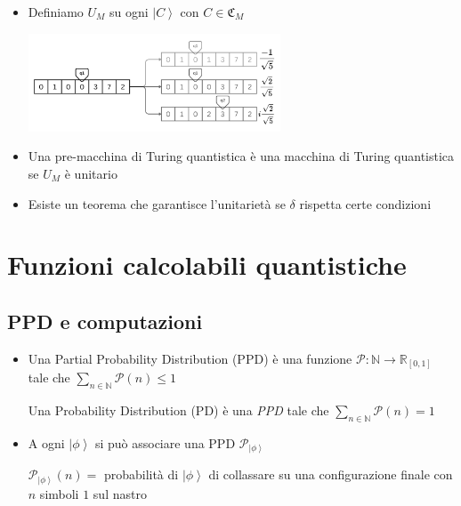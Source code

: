 \documentclass{beamer}
\newcommand{\ket}[1]{\left | #1 \right \rangle}
\newcommand{\conf}{\mathfrak{C}_{M}}
\begin{document}
\begin{frame}{\subsecname}{}
	\begin{itemize}
		\item Definiamo \( U_{M} \) su ogni \(\ket{C} \) con \( C \in \conf \) \par
		\centering\includegraphics[width=7.5cm]{transition2.png}
		\item Una pre-macchina di Turing quantistica è una \alert{macchina di Turing quantistica} se \( U_{M} \) è unitario
		\item Esiste un teorema che garantisce l'unitarietà se \(\delta\) rispetta certe condizioni
	\end{itemize}
\end{frame}

\section{Funzioni calcolabili quantistiche}

\subsection{PPD e computazioni}

\begin{frame}{\secname}{\subsecname}
	\begin{itemize}
		\item Una \alert{Partial Probability Distribution (PPD)} è una funzione \( \mathcal{P} : \mathbb{N} \rightarrow \mathbb{R}_{[0,1]} \) tale che \( \sum_{n \in \mathbb{N}} \mathcal{P} \left ( n \right ) \le 1 \)\par
		Una \alert{Probability Distribution (PD)} è una \textit{PPD} tale che \( \sum_{n \in \mathbb{N}} \mathcal{P} \left ( n \right ) = 1 \)
		\item A ogni \( \ket{\phi} \) si può associare una PPD \( \mathcal{P}_{\ket{\phi}} \)\par
		\( \mathcal{P}_{\ket{\phi}} \left ( n \right ) = \) probabilità di \( \ket{\phi} \) di collassare su una configurazione finale con \(n\) simboli \(1\) sul nastro
	\end{itemize}
\end{frame}
\end{document}
